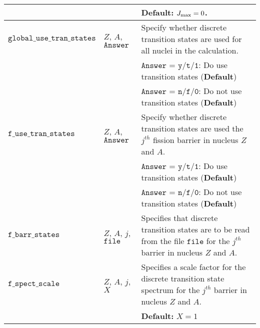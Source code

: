 \documentclass[
10pt,
showpacs,preprintnumbers,footinbib,
amsfonts,amsmath,amssymb,
aps,
prc,twocolumn,groupedaddress,superscriptaddress,
showkeys,
nofootinbib
]{revtex4-1}
\begin{document}
\begin{center}
\begin{tabular}{| p{4cm} | p{4cm} | p{9cm} |}
 & & {\bf Default:} $J_{\rm max} = 0$.\\
\hline
${\texttt{global\_use\_tran\_states}}$   &  $Z$, $A$, ${\texttt{Answer}}$ & Specify whether discrete transition states are used for all nuclei in the calculation.\\
& & ${\texttt{Answer = y/t/1}}$: Do use transition states ({\bf Default})\\
& & ${\texttt{Answer = n/f/0}}$: Do not use transition states ({\bf Default})\\
\hline
${\texttt{f\_use\_tran\_states}}$   &  $Z$, $A$, ${\texttt{Answer}}$ & Specify whether discrete transition states are used the $j^{th}$ fission barrier in nucleus $Z$ and $A$.\\
& & ${\texttt{Answer = y/t/1}}$: Do use transition states ({\bf Default})\\
& & ${\texttt{Answer = n/f/0}}$: Do not use transition states ({\bf Default})\\
\hline
${\texttt{f\_barr\_states}}$   &  $Z$, $A$, $j$, ${\texttt{file}}$ & Specifies that discrete transition states are to be read from the file ${\texttt{file}}$ for the $j^{th}$ barrier in nucleus $Z$ and $A$.\\
\hline
${\texttt{f\_spect\_scale}}$ & $Z$, $A$, $j$, $X$ & Specifies a scale factor for the discrete transition state spectrum for the $j^{th}$ barrier in nucleus $Z$ and $A$.\\
& & {\bf Default:} $X=1$\\
\hline
\end{tabular}
\end{center}
\end{document}
